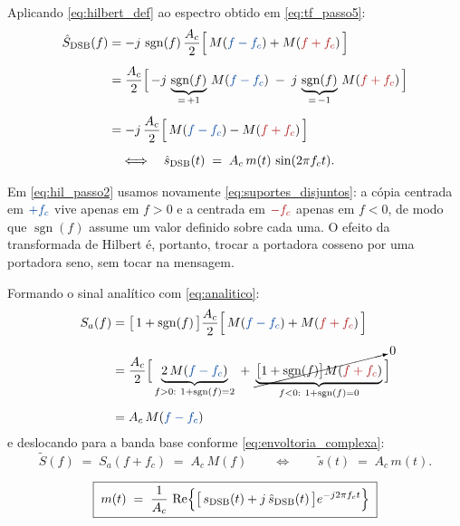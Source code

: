 \documentclass[11pt,a4paper]{article}
\newcommand{\DSB}{\text{DSB}}
\DeclareMathOperator{\sgn}{sgn}
\begin{document}
Aplicando \eqref{eq:hilbert_def} ao espectro obtido em \eqref{eq:tf_passo5}:
\begin{align}
  \hat{S}_{\DSB}(f)
  &= -j\,\sgn(f)\,\frac{A_c}{2}\Bigl[\, M(\textcolor{azul}{f-f_c}) + M(\textcolor{vermelho}{f+f_c}) \,\Bigr]
  \label{eq:hil_passo1}\\[0.5em]
  &= \frac{A_c}{2}\Bigl[\, -j\,\underbrace{\sgn(f)}_{=\,+1}\,M(\textcolor{azul}{f-f_c})
   \;-\; j\,\underbrace{\sgn(f)}_{=\,-1}\,M(\textcolor{vermelho}{f+f_c}) \,\Bigr]
  \label{eq:hil_passo2}\\[0.5em]
  &= -j\,\frac{A_c}{2}\Bigl[\, M(\textcolor{azul}{f-f_c}) - M(\textcolor{vermelho}{f+f_c}) \,\Bigr]
  \label{eq:hil_passo3}\\[0.5em]
  &\quad\Longleftrightarrow\quad
  \hat{s}_{\DSB}(t) \;=\; A_c\, m(t)\, \sin(2\pi f_c t).
  \label{eq:hil_passo4}
\end{align}

Em \eqref{eq:hil_passo2} usamos novamente \eqref{eq:suportes_disjuntos}: a cópia centrada em $\textcolor{azul}{+f_c}$ vive apenas em $f>0$ e a centrada em $\textcolor{vermelho}{-f_c}$ apenas em $f<0$, de modo que $\sgn(f)$ assume um valor definido sobre cada uma. O efeito da transformada de Hilbert é, portanto, trocar a portadora cosseno por uma portadora seno, sem tocar na mensagem.

Formando o sinal analítico com \eqref{eq:analitico}:
\begin{align}
  S_{a}(f)
  &= \bigl[\,1+\sgn(f)\,\bigr]\frac{A_c}{2}\Bigl[\, M(\textcolor{azul}{f-f_c}) + M(\textcolor{vermelho}{f+f_c}) \,\Bigr]
  \label{eq:ana_passo1}\\[0.5em]
  &= \frac{A_c}{2}\Bigl[\,\underbrace{2\,M(\textcolor{azul}{f-f_c})}_{f>0:\ 1+\sgn(f)=2}
   \;+\; \underbrace{\cancelto{0}{\bigl[1+\sgn(f)\bigr]M(\textcolor{vermelho}{f+f_c})}}_{f<0:\ 1+\sgn(f)=0}\,\Bigr]
  \label{eq:ana_passo2}\\[0.5em]
  &= A_c\, M(\textcolor{azul}{f-f_c})
  \label{eq:ana_passo3}
\end{align}
e deslocando para a banda base conforme \eqref{eq:envoltoria_complexa}:
\begin{equation}
  \tilde{S}(f) \;=\; S_a(f+f_c) \;=\; A_c\, M(f)
  \qquad\Longleftrightarrow\qquad
  \tilde{s}(t) \;=\; A_c\, m(t).
  \label{eq:envoltoria_dsbsc}
\end{equation}

\begin{quadro}
\[
  \boxed{\;m(t) \;=\; \frac{1}{A_c}\,\operatorname{Re}\Bigl\{\bigl[\,s_{\DSB}(t) + j\,\hat{s}_{\DSB}(t)\,\bigr] e^{-j2\pi f_c t}\Bigr\}\;}
\]
\end{quadro}
\end{document}
